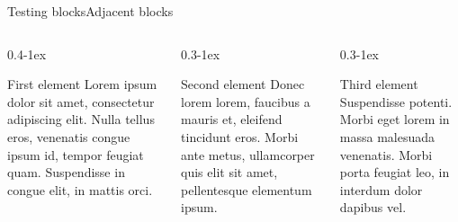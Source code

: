 \documentclass[aspectratio=169]{beamer}
\begin{document}

\begin{frame}{Testing blocks}{Adjacent blocks}
  \begin{columns}[t,onlytextwidth]
    \begin{column}{0.4\textwidth-1ex}
      \begin{block}{First element}
        Lorem ipsum dolor sit amet, consectetur adipiscing elit. Nulla tellus eros, venenatis congue ipsum id, tempor feugiat quam. Suspendisse in congue elit, in mattis orci.
      \end{block}
    \end{column}

    \begin{column}{0.3\textwidth-1ex}
      \begin{block}{Second element}
        Donec lorem lorem, faucibus a mauris et, eleifend tincidunt eros. Morbi ante metus, ullamcorper quis elit sit amet, pellentesque elementum ipsum.
      \end{block}
    \end{column}

    \begin{column}{0.3\textwidth-1ex}
      \begin{block}{Third element}
        Suspendisse potenti. Morbi eget lorem in massa malesuada venenatis. Morbi porta feugiat leo, in interdum dolor dapibus vel.
      \end{block}
    \end{column}
  \end{columns}
\end{frame}


\end{document}
